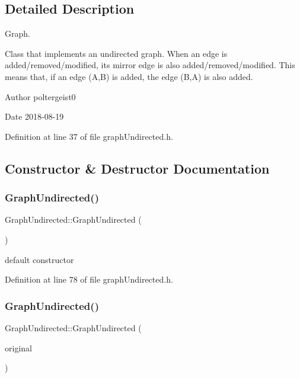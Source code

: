\subsection{Detailed Description}
Graph. 

Class that implements an undirected graph. When an edge is added/removed/modified, its mirror edge is also added/removed/modified. This means that, if an edge (A,B) is added, the edge (B,A) is also added.

\begin{DoxyAuthor}{Author}
poltergeist0
\end{DoxyAuthor}
\begin{DoxyDate}{Date}
2018-\/08-\/19 
\end{DoxyDate}


Definition at line 37 of file graph\+Undirected.\+h.



\subsection{Constructor \& Destructor Documentation}
\mbox{\label{classGraphUndirected_a00b1e3fe0aaa6fd6e63b94920e40a0ed}} 
\subsubsection{\texorpdfstring{Graph\+Undirected()}{GraphUndirected()}\hspace{0.1cm}{\footnotesize\ttfamily [1/2]}}
{\footnotesize\ttfamily Graph\+Undirected\+::\+Graph\+Undirected (\begin{DoxyParamCaption}{ }\end{DoxyParamCaption})\hspace{0.3cm}{\ttfamily [inline]}}

default constructor 

Definition at line 78 of file graph\+Undirected.\+h.

\mbox{\label{classGraphUndirected_a882c4cec7971177f9eab04319b5b0b62}} 
\subsubsection{\texorpdfstring{Graph\+Undirected()}{GraphUndirected()}\hspace{0.1cm}{\footnotesize\ttfamily [2/2]}}
{\footnotesize\ttfamily Graph\+Undirected\+::\+Graph\+Undirected (\begin{DoxyParamCaption}\item[{const \hyperlink{classGraphUndirected}{Graph\+Undirected} \&}]{original }\end{DoxyParamCaption})\hspace{0.3cm}{\ttfamily [inline]}}

